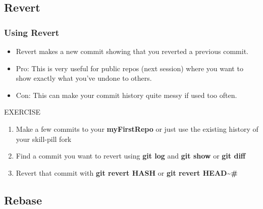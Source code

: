 \documentclass{beamer}
\begin{document}
\subsection{Revert}

\begin{frame}[fragile]
\frametitle{Using Revert}
\begin{itemize}
\item Revert makes a new commit showing that you reverted a previous commit.
\item Pro: This is very useful for public repos (next session) where you want to show exactly what you've undone to others.
\item Con: This can make your commit history quite messy if used too often. 
\end{itemize}
    \begin{block}{EXERCISE}
        \begin{enumerate}
        \item Make a few commits to your \textbf{myFirstRepo} or just use the existing history of your skill-pill fork
	 \item Find a commit you want to revert using \textbf{git log} and \textbf{git show} or \textbf{git diff}
	 \item Revert that commit with \textbf{git revert \textlangle{}HASH\textrangle{}} or \textbf{git revert HEAD\textasciitilde\textlangle{}\#\textrangle{}}
        \end{enumerate}
    \end{block}
\end{frame}

\subsection{Rebase}
\end{document}
